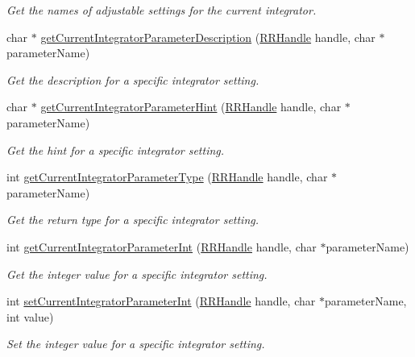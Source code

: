 \begin{DoxyCompactItemize}
\begin{DoxyCompactList}\small\item\em Get the names of adjustable settings for the current integrator. \end{DoxyCompactList}\item 
char $\ast$ \hyperlink{group__simopts_gae4308a0893d84e49ef877d2db65d110c}{get\+Current\+Integrator\+Parameter\+Description} (\hyperlink{rrc__types_8h_a1d68f0592372208fa5a5f2799ea4b3ae}{R\+R\+Handle} handle, char $\ast$parameter\+Name)
\begin{DoxyCompactList}\small\item\em Get the description for a specific integrator setting. \end{DoxyCompactList}\item 
char $\ast$ \hyperlink{group__simopts_ga4cc4c3b42b58f7ce266cff67cbc79c85}{get\+Current\+Integrator\+Parameter\+Hint} (\hyperlink{rrc__types_8h_a1d68f0592372208fa5a5f2799ea4b3ae}{R\+R\+Handle} handle, char $\ast$parameter\+Name)
\begin{DoxyCompactList}\small\item\em Get the hint for a specific integrator setting. \end{DoxyCompactList}\item 
int \hyperlink{group__simopts_ga04f015cae3234d1e24dc86c4ca6cf7ab}{get\+Current\+Integrator\+Parameter\+Type} (\hyperlink{rrc__types_8h_a1d68f0592372208fa5a5f2799ea4b3ae}{R\+R\+Handle} handle, char $\ast$parameter\+Name)
\begin{DoxyCompactList}\small\item\em Get the return type for a specific integrator setting. \end{DoxyCompactList}\item 
int \hyperlink{group__simopts_ga23b63638fae7a4823ac503474126c85b}{get\+Current\+Integrator\+Parameter\+Int} (\hyperlink{rrc__types_8h_a1d68f0592372208fa5a5f2799ea4b3ae}{R\+R\+Handle} handle, char $\ast$parameter\+Name)
\begin{DoxyCompactList}\small\item\em Get the integer value for a specific integrator setting. \end{DoxyCompactList}\item 
int \hyperlink{group__simopts_ga4b5b2be1b4a77b8225f5c7d9a1e0bdfb}{set\+Current\+Integrator\+Parameter\+Int} (\hyperlink{rrc__types_8h_a1d68f0592372208fa5a5f2799ea4b3ae}{R\+R\+Handle} handle, char $\ast$parameter\+Name, int value)
\begin{DoxyCompactList}\small\item\em Set the integer value for a specific integrator setting. \end{DoxyCompactList}\item 

\end{DoxyCompactItemize}
